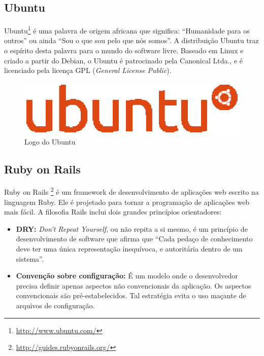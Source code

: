 \subsection{Ubuntu}

Ubuntu\footnote{\url{http://www.ubuntu.com/}} é uma palavra de origem africana que significa: ``Humanidade para os outros'' ou ainda ``Sou o que sou pelo que nós somos''. A distribuição Ubuntu traz o espírito desta palavra para o mundo do software livre. Baseado em Linux e criado a partir do Debian, o Ubuntu é patrocinado pela Canonical Ltda., e é licenciado pela licença GPL (\textit{General License Public}).

\begin{figure}[!h]
	\centering
	\includegraphics[scale=0.4]{figuras/capitulo3/ubuntu.eps}
	\caption{Logo do Ubuntu}
	\label{ubuntu}
\end{figure}

\subsection{Ruby on Rails}

Ruby on Rails \footnote{\url{http://guides.rubyonrails.org/}} é um framework de desenvolvimento de aplicações web escrito na linguagem Ruby. Ele é projetado para tornar a programação de aplicações web mais fácil. A filosofia Rails inclui dois grandes princípios orientadores:

\begin{itemize}
	\item \textbf{DRY:} \textit{Don't Repeat Yourself}, ou não repita a si mesmo, é um princípio de desenvolvimento de software que afirma que ``Cada pedaço de conhecimento deve ter uma única representação inequívoca, e autoritária dentro de um sistema''.

	\item \textbf{Convenção sobre configuração:} É um modelo onde o desenvolvedor precisa definir apenas aspectos não convencionais da aplicação. Os aspectos convencionais são pré-estabelecidos. Tal estratégia evita o uso maçante de arquivos de configuração.
\end{itemize}

